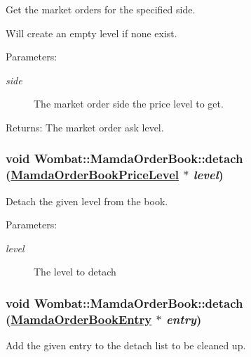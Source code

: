 Get the market orders for the specified side. 

Will create an empty level if none exist.

\begin{Desc}
\item[Parameters:]
\begin{description}
\item[{\em side}]The market order side the price level to get. \end{description}
\end{Desc}
\begin{Desc}
\item[Returns:]The market order ask level. \end{Desc}
\hypertarget{classWombat_1_1MamdaOrderBook_503c960afbcdea3ddae2d58812a41708}{
\subsubsection[detach]{\setlength{\rightskip}{0pt plus 5cm}void Wombat::Mamda\-Order\-Book::detach (\hyperlink{classWombat_1_1MamdaOrderBookPriceLevel}{Mamda\-Order\-Book\-Price\-Level} $\ast$ {\em level})}}
\label{classWombat_1_1MamdaOrderBook_503c960afbcdea3ddae2d58812a41708}


Detach the given level from the book. 

\begin{Desc}
\item[Parameters:]
\begin{description}
\item[{\em level}]The level to detach \end{description}
\end{Desc}
\hypertarget{classWombat_1_1MamdaOrderBook_d24551ff578bd714feb260dc1a5db8a0}{
\subsubsection[detach]{\setlength{\rightskip}{0pt plus 5cm}void Wombat::Mamda\-Order\-Book::detach (\hyperlink{classWombat_1_1MamdaOrderBookEntry}{Mamda\-Order\-Book\-Entry} $\ast$ {\em entry})}}
\label{classWombat_1_1MamdaOrderBook_d24551ff578bd714feb260dc1a5db8a0}


Add the given entry to the detach list to be cleaned up. 

